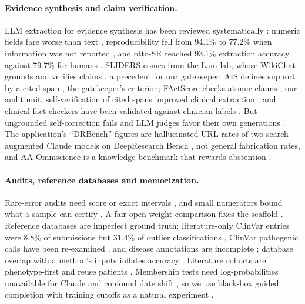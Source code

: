 \documentclass{article} %
\begin{document}
\paragraph{Evidence synthesis and claim verification.} LLM extraction for evidence synthesis has been reviewed systematically \citep{Shankar2026PerformanceLarge}: numeric fields fare worse than text \citep{kataoka2025_gpt4o_o3_extraction}, reproducibility fell from 94.1\% to 77.2\% when information was not reported \citep{Jensen2025Chatgpt4oCan}, and otto-SR reached 93.1\% extraction accuracy against 79.7\% for humans \citep{cao2025_ottosr}. SLIDERS comes from the Lam lab, whose WikiChat grounds and verifies claims \citep{semnani2023_wikichat}, a precedent for our gatekeeper. AIS defines support by a cited span \citep{rashkin2023_ais}, the gatekeeper's criterion; FActScore checks atomic claims \citep{min2023_factscore}, our audit unit; self-verification of cited spans improved clinical extraction \citep{gero2023_self_verification}; and clinical fact-checkers have been validated against clinician labels \citep{Chung2026VerifyingFacts}. But ungrounded self-correction fails \citep{huang2024_no_self_correct} and LLM judges favor their own generations \citep{zheng2023_llm_judge,Panickssery2024LlmEvaluators}. The application's ``DRBench'' figures are hallucinated-URL rates of two search-augmented Claude models \citep{rao2026_reference_hallucination} on DeepResearch Bench \citep{du2025_deepresearchbench}, not general fabrication rates, and AA-Omniscience is a knowledge benchmark that rewards abstention \citep{jackson2025_aa_omniscience}.

\paragraph{Audits, reference databases and memorization.} Rare-error audits need score or exact intervals \citep{brown2001_binomial_ci}, and small numerators bound what a sample can certify \citep{hanley1983_zero_numerators}. A fair open-weight comparison fixes the scaffold \citep{dorfner2024_open_vs_commercial_radiology}. Reference databases are imperfect ground truth: literature-only ClinVar entries were 8.8\% of submissions but 31.4\% of outlier classifications \citep{yang2017_clinvar_discordance}, ClinVar pathogenic calls have been re-examined \citep{wright2021_ddd_clinvar}, and disease annotations are incomplete \citep{connelly2026_fanconi_annotations}; database overlap with a method's inputs inflates accuracy \citep{Grimm2015EvaluationTools}. Literature cohorts are phenotype-first \citep{wright2024_penetrance} and reuse patients \citep{shivakumar2026_cohort_reliance}. Membership tests need log-probabilities unavailable for Claude \citep{shi2024_mink_prob} and confound date shift \citep{duan2024_mia_llm}, so we use black-box guided completion \citep{golchin2024_time_travel} with training cutoffs as a natural experiment \citep{roberts2024_lens_of_time}.
\end{document}
